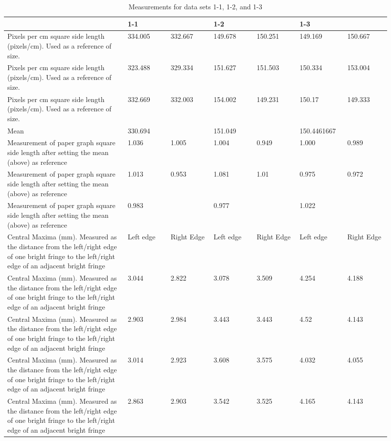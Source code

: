 \documentclass[12pt]{article}
\begin{document}
\begin{longtable}{p{0.28\linewidth}p{0.105\linewidth}p{0.105\linewidth}p{0.105\linewidth}p{0.105\linewidth}p{0.105\linewidth}p{0.105\linewidth}}
\caption{Measurements for data sets 1-1, 1-2, and 1-3}\label{tab:data1}\\
\hline
 & 1-1 &  & 1-2 &  & 1-3 &  \\
\hline
Pixels per cm square side length (pixels/cm). Used as a reference of size. & 334.005 & 332.667 & 149.678 & 150.251 & 149.169 & 150.667 \\
Pixels per cm square side length (pixels/cm). Used as a reference of size. & 323.488 & 329.334 & 151.627 & 151.503 & 150.334 & 153.004 \\
Pixels per cm square side length (pixels/cm). Used as a reference of size. & 332.669 & 332.003 & 154.002 & 149.231 & 150.17 & 149.333 \\
Mean & 330.694 &  & 151.049 &  & 150.4461667 &  \\
Measurement of paper graph square side length after setting the mean (above) as reference & 1.036 & 1.005 & 1.004 & 0.949 & 1.000 & 0.989 \\
Measurement of paper graph square side length after setting the mean (above) as reference & 1.013 & 0.953 & 1.081 & 1.01 & 0.975 & 0.972 \\
Measurement of paper graph square side length after setting the mean (above) as reference & 0.983 &  & 0.977 &  & 1.022 &  \\
Central Maxima (mm). Measured as the distance from the left/right edge of one bright fringe to the left/right edge of an adjacent bright fringe & Left edge & Right Edge & Left edge & Right Edge & Left edge & Right Edge \\
Central Maxima (mm). Measured as the distance from the left/right edge of one bright fringe to the left/right edge of an adjacent bright fringe & 3.044 & 2.822 & 3.078 & 3.509 & 4.254 & 4.188 \\
Central Maxima (mm). Measured as the distance from the left/right edge of one bright fringe to the left/right edge of an adjacent bright fringe & 2.903 & 2.984 & 3.443 & 3.443 & 4.52 & 4.143 \\
Central Maxima (mm). Measured as the distance from the left/right edge of one bright fringe to the left/right edge of an adjacent bright fringe & 3.014 & 2.923 & 3.608 & 3.575 & 4.032 & 4.055 \\
Central Maxima (mm). Measured as the distance from the left/right edge of one bright fringe to the left/right edge of an adjacent bright fringe & 2.863 & 2.903 & 3.542 & 3.525 & 4.165 & 4.143 \\

\end{longtable}
\end{document}
